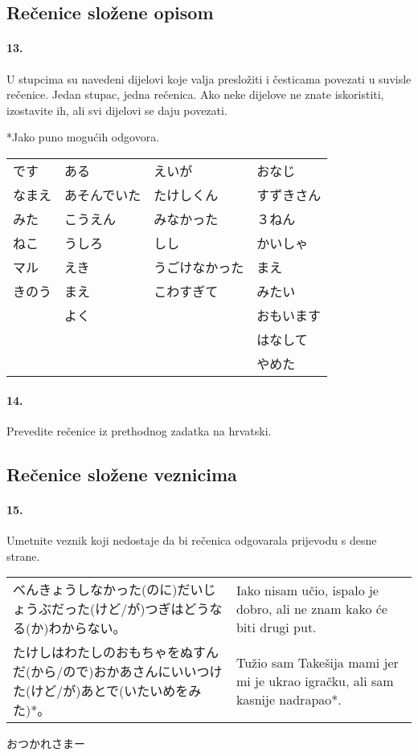 \documentclass[12pt]{article}
\begin{document}
	\subsection{Rečenice složene opisom}
	
	\paragraph{13.} U stupcima su navedeni dijelovi koje valja presložiti i česticama povezati u suvisle rečenice. Jedan stupac, jedna rečenica. Ako neke dijelove ne znate iskoristiti, izostavite ih, ali svi dijelovi se daju povezati.
	
	*Jako puno mogućih odgovora.
	
	\begin{tabularx}{\textwidth}{X X X X}
		です&ある&えいが&おなじ\\
		なまえ&あそんでいた&たけしくん&すずきさん\\
		みた&こうえん&みなかった&３ねん\\
		ねこ&うしろ&しし&かいしゃ\\
		マル&えき&うごけなかった&まえ\\
		きのう&まえ&こわすぎて&みたい\\
		&よく&&おもいます\\
		&&&はなして\\
		&&&やめた\\
	\end{tabularx}

	\paragraph{14.} Prevedite rečenice iz prethodnog zadatka na hrvatski.
	
	\subsection{Rečenice složene veznicima}
	
	\paragraph{15.} Umetnite veznik koji nedostaje da bi rečenica odgovarala prijevodu s desne strane.
	
	\begin{tabularx}{\textwidth}{X X}
		べんきょうしなかった(のに)だいじょうぶだった(けど/が)つぎはどうなる(か)わからない。&Iako nisam učio, ispalo je dobro, ali ne znam kako će biti drugi put.\\
		たけしはわたしのおもちゃをぬすんだ(から/ので)おかあさんにいいつけた(けど/が)あとで(いたいめをみた)*。&Tužio sam Takešija mami jer mi je ukrao igračku, ali sam kasnije nadrapao*.
	\end{tabularx}

\flushright おつかれさまー
\end{document}
